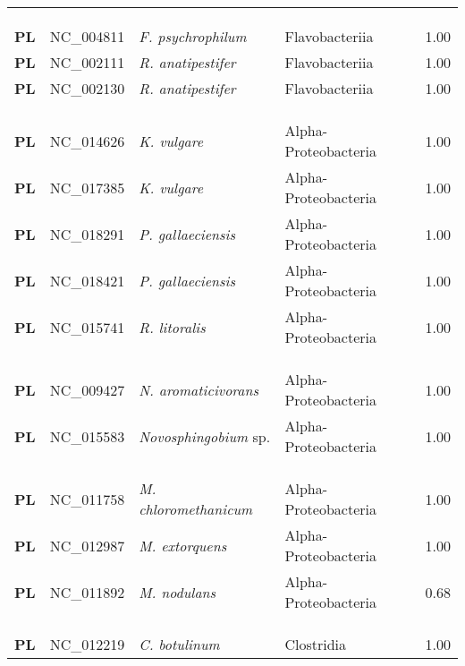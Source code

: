 \begin{adjustwidth}{-3cm}{2cm}
{\begin{supertabular}{>{\bfseries}l|p{0.1\textwidth}p{0.14\textwidth}l|l}
\\
\\
\hline\\
PL & NC\_004811 & \textit{F. psychrophilum} & Flavobacteriia & 1.00\\
PL & NC\_002111 & \textit{R. anatipestifer} & Flavobacteriia & 1.00\\
PL & NC\_002130 & \textit{R. anatipestifer} & Flavobacteriia & 1.00\\
\\
\\
\hline\\
PL & NC\_014626 & \textit{K. vulgare} & Alpha-Proteobacteria & 1.00\\
PL & NC\_017385 & \textit{K. vulgare} & Alpha-Proteobacteria & 1.00\\
PL & NC\_018291 & \textit{P. gallaeciensis} & Alpha-Proteobacteria & 1.00\\
PL & NC\_018421 & \textit{P. gallaeciensis} & Alpha-Proteobacteria & 1.00\\
PL & NC\_015741 & \textit{R. litoralis} & Alpha-Proteobacteria & 1.00\\
\\
\\
\hline\\
PL & NC\_009427 & \textit{N. aromaticivorans} & Alpha-Proteobacteria & 1.00\\
PL & NC\_015583 & \textit{Novosphingobium} sp. & Alpha-Proteobacteria & 1.00\\
\\
\\
\hline\\
PL & NC\_011758 & \textit{M. chloromethanicum} & Alpha-Proteobacteria & 1.00\\
PL & NC\_012987 & \textit{M. extorquens} & Alpha-Proteobacteria & 1.00\\
PL & NC\_011892 & \textit{M. nodulans} & Alpha-Proteobacteria & 0.68\\
\\
\\
\hline\\
PL & NC\_012219 & \textit{C. botulinum} & Clostridia & 1.00\\

\end{supertabular}}
\end{adjustwidth}
